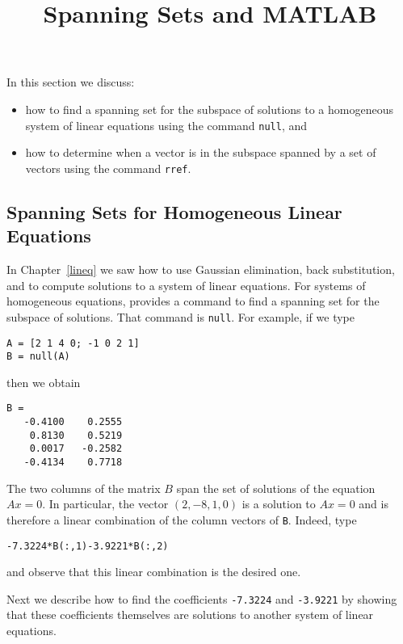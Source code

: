 \documentclass{ximera}
\title{Spanning Sets and MATLAB}
\begin{document}
\begin{abstract}
\end{abstract}
\maketitle

 \label{S:5.3}

In this section we discuss:
\begin{itemize}
\item	how to find a spanning set for the subspace of solutions to a
homogeneous system of linear equations using the \Matlab command {\tt null},
and
\item	how to determine when a vector is in the subspace spanned by a
set of vectors using the \Matlab command {\tt rref}.
\end{itemize}

\subsection*{Spanning Sets for Homogeneous Linear Equations}

In Chapter~\ref{lineq} we saw how to use Gaussian elimination,
back substitution, and \Matlab to compute solutions to a system
of linear equations.  For systems of
homogeneous equations, \Matlab
provides a command to find a spanning set for the subspace of solutions.
That command is {\tt null}.  For example, if we type
\begin{verbatim}
A = [2 1 4 0; -1 0 2 1]
B = null(A)
\end{verbatim} 
then we obtain
\begin{verbatim}
B =
   -0.4100    0.2555
    0.8130    0.5219
    0.0017   -0.2582
   -0.4134    0.7718
\end{verbatim}
The two columns of the matrix $B$ span the set of solutions of
the equation $Ax=0$.  In particular, the vector $(2,-8,1,0)$ is a
solution to $Ax=0$ and is therefore a
linear combination  of the
column vectors of {\tt B}.  Indeed, type
\begin{verbatim}
-7.3224*B(:,1)-3.9221*B(:,2)
\end{verbatim}
and observe that this linear combination is the desired one.

Next we describe how to find the coefficients {\tt -7.3224} and
{\tt -3.9221} by showing that these coefficients themselves are
solutions to another system of linear equations.
\end{document}
